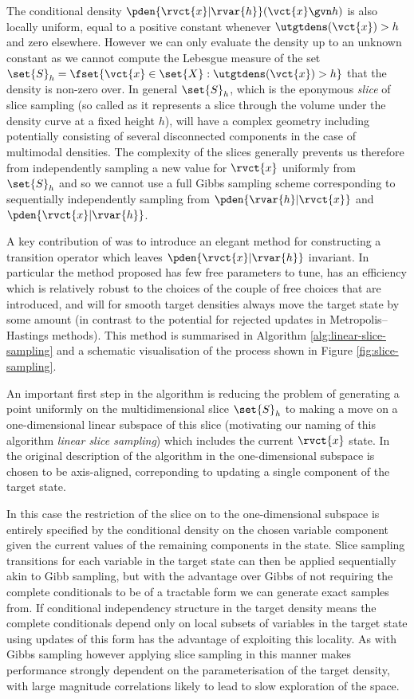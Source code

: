 The conditional density $\pden{\rvct{x}|\rvar{h}}(\vct{x}\gvn h)$ is also locally uniform, equal to a positive constant whenever $\utgtdens(\vct{x}) > h$ and zero elsewhere. However we can only evaluate the density up to an unknown constant as we cannot compute the Lebesgue measure of the set $\set{S}_h = \fset{\vct{x} \in \set{X} : \utgtdens(\vct{x}) > h}$ that the density is non-zero over. In general $\set{S}_h$, which is the eponymous \emph{slice} of slice sampling (so called as it represents a slice through the volume under the density curve at a fixed height $h$), will have a complex geometry including potentially consisting of several disconnected components in the case of multimodal densities. The complexity of the slices generally prevents us therefore from independently sampling a new value for $\rvct{x}$ uniformly from $\set{S}_h$ and so we cannot use a full Gibbs sampling scheme corresponding to sequentially independently sampling from $\pden{\rvar{h}|\rvct{x}}$ and $\pden{\rvct{x}|\rvar{h}}$.

A key contribution of \citep{neal2003slice} was to introduce an elegant method for constructing a transition operator which leaves $\pden{\rvct{x}|\rvar{h}}$ invariant. In particular the method proposed has few free parameters to tune, has an efficiency which is relatively robust to the choices of the couple of free choices that are introduced, and will for smooth target densities always move the target state by some amount (in contrast to the potential for rejected updates in Metropolis--Hastings methods). This method is summarised in Algorithm \ref{alg:linear-slice-sampling} and a schematic visualisation of the process shown in Figure \ref{fig:slice-sampling}.

An important first step in the algorithm is reducing the problem of generating a point uniformly on the multidimensional slice $\set{S}_h$ to making a move on a one-dimensional linear subspace of this slice  (motivating our naming of this algorithm \emph{linear slice sampling}) which includes the current $\rvct{x}$ state. In the original description of the algorithm in \citep{neal2003slice} the one-dimensional subspace is chosen to be axis-aligned, correponding to updating a single component of the target state. 

In this case the restriction of the slice on to the one-dimensional subspace is entirely specified by the conditional density on the chosen variable component given the current values of the remaining components in the state. Slice sampling transitions for each variable in the target state can then be applied sequentially akin to Gibb sampling, but with the advantage over Gibbs of not requiring the complete conditionals to be of a tractable form we can generate exact samples from. If conditional independency structure in the target density means the complete conditionals depend only on local subsets of variables in the target state using updates of this form has the advantage of exploiting this locality. As with Gibbs sampling however applying slice sampling in this manner makes performance strongly dependent on the parameterisation of the target density, with large magnitude correlations likely to lead to slow exploration of the space. 

